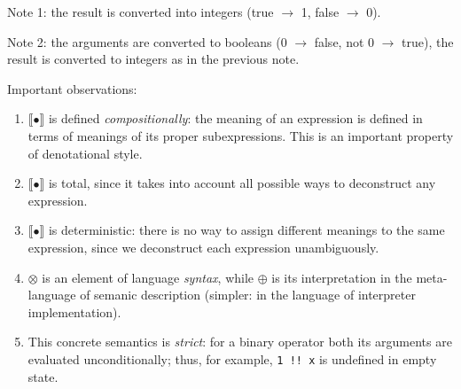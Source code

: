 \documentclass{article}
\newcommand{\sembr}[1]{\llbracket{#1}\rrbracket}
\theoremstyle{definition}
\begin{document}
Note 1: the result is converted into integers (true $\to$ 1, false $\to$ 0).

Note 2: the arguments are converted to booleans (0 $\to$ false, not 0 $\to$ true), the result is converted to
integers as in the previous note.

Important observations:

\begin{enumerate}
  \item $\sembr{\bullet}$ is defined \emph{compositionally}: the meaning of an expression is defined in terms of meanings
  of its proper subexpressions. This is an important property of denotational style.
  \item $\sembr{\bullet}$ is total, since it takes into account all possible ways to deconstruct any expression.
  \item $\sembr{\bullet}$ is deterministic: there is no way to assign different meanings to the same expression, since
  we deconstruct each expression unambiguously.
  \item $\otimes$ is an element of language \emph{syntax}, while $\oplus$ is its interpretation in the meta-language of
  semanic description (simpler: in the language of interpreter implementation).
  \item This concrete semantics is \emph{strict}: for a binary operator both its arguments are evaluated unconditionally; thus,
  for example, \lstinline|1 !! x| is undefined in empty state.
\end{enumerate}
\end{document}
